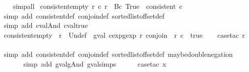 \begin{isabellebody}
\ \ \isamarkupfalse%
\ simp{\isacharunderscore}all%
\endisatagproof
{\isafoldproof}%
%
\isadelimproof
\isanewline
%
\endisadelimproof
\isanewline
{}\isamarkupfalse%
\ consistent{\isacharunderscore}empty{\isacharunderscore}{}{\isacharcolon}\ {\isachardoublequoteopen}{\isacharparenleft}{\isasymforall}r{\isachardot}\ c\ r\ {\isacharequal}\ {\isacharbraceleft}{\isacharbar}Bc\ True{\isacharbar}{\isacharbraceright}{\isacharparenright}\ {\isasymlongrightarrow}\ consistent\ c{\isachardoublequoteclose}\isanewline
%
\isadelimproof
\ \ %
\endisadelimproof
%
\isatagproof
{}\isamarkupfalse%
\ {\isacharparenleft}simp\ add{\isacharcolon}\ consistent{\isacharunderscore}def\ conjoin{\isacharunderscore}def\ sorted{\isacharunderscore}list{\isacharunderscore}of{\isacharunderscore}fset{\isacharunderscore}def{\isacharparenright}\isanewline
\ \ \isamarkupfalse%
\ {\isacharparenleft}simp\ add{\isacharcolon}\ cval{\isacharunderscore}And\ cval{\isacharunderscore}true{\isacharparenright}%
\endisatagproof
{\isafoldproof}%
%
\isadelimproof
\isanewline
%
\endisadelimproof
\isanewline
{}\isamarkupfalse%
\ consistent{\isacharunderscore}empty{\isacharunderscore}{}{\isacharcolon}\ {\isachardoublequoteopen}{\isasymlbrakk}{\isasymrbrakk}\ r\ {\isacharequal}\ {\isacharbraceleft}{\isacharbar}Undef{\isacharbar}{\isacharbraceright}\ {\isasymor}\ gval\ {\isacharparenleft}cexp{}gexp\ r\ {\isacharparenleft}conjoin\ {\isacharparenleft}{\isasymlbrakk}{\isasymrbrakk}\ r{\isacharparenright}{\isacharparenright}{\isacharparenright}\ c\ {\isacharequal}\ true{\isachardoublequoteclose}\isanewline
%
\isadelimproof
\ \ %
\endisadelimproof
%
\isatagproof
{}\isamarkupfalse%
\ {\isacharparenleft}case{\isacharunderscore}tac\ r{\isacharparenright}\isanewline
\ \ \ \ \ \isamarkupfalse%
\ {\isacharparenleft}simp\ add{\isacharcolon}\ consistent{\isacharunderscore}def\ conjoin{\isacharunderscore}def\ sorted{\isacharunderscore}list{\isacharunderscore}of{\isacharunderscore}fset{\isacharunderscore}def\ maybe{\isacharunderscore}double{\isacharunderscore}negation{\isacharparenright}\isanewline
\ \ \ \ \ \isamarkupfalse%
\ {\isacharparenleft}simp\ add{\isacharcolon}\ gval{\isacharunderscore}gAnd\ gval{\isachardot}simps{\isacharparenleft}{}{\isacharparenright}{\isacharparenright}\isanewline
\ \ \ \ \isamarkupfalse%
\ {\isacharparenleft}case{\isacharunderscore}tac\ x{}{\isacharparenright}\isanewline
\ \ \ \ \ \isamarkupfalse%

\end{isabellebody}
